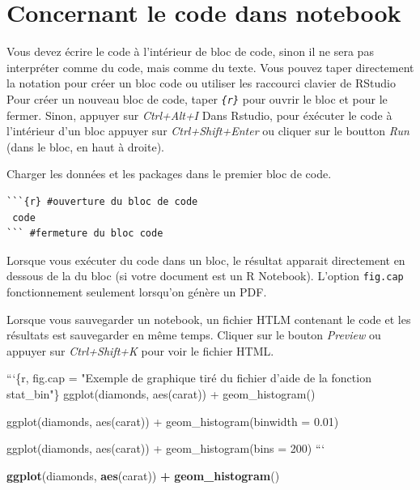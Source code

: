 \documentclass[12pt,]{book}
\newenvironment{Shaded}{\begin{snugshade}}{\end{snugshade}}
\newcommand{\BaseNTok}[1]{\textcolor[rgb]{0.06,0.06,0.06}{#1}}
\newcommand{\KeywordTok}[1]{\textcolor[rgb]{0.27,0.27,0.27}{\textbf{#1}}}
\newcommand{\NormalTok}[1]{#1}
\newcommand{\OperatorTok}[1]{\textcolor[rgb]{0.43,0.43,0.43}{\textbf{#1}}}
\newcommand{\StringTok}[1]{\textcolor[rgb]{0.5,0.5,0.5}{#1}}
\begin{document}
\hypertarget{concernant-le-code-dans-notebook}{%
\section{Concernant le code dans notebook}\label{concernant-le-code-dans-notebook}}

Vous devez écrire le code à l'intérieur de bloc de code, sinon il ne sera pas interpréter comme du code, mais comme du texte.
Vous pouvez taper directement la notation pour créer un bloc code ou utiliser les raccourci clavier de RStudio
Pour créer un nouveau bloc de code, taper \emph{\texttt{\textasciigrave{}\textasciigrave{}\textasciigrave{}\{r\}}} pour ouvrir le bloc et \emph{\texttt{\textasciigrave{}\textasciigrave{}\textasciigrave{}}} pour le fermer.
Sinon, appuyer sur \emph{Ctrl+Alt+I}
Dans Rstudio, pour éxécuter le code à l'intérieur d'un bloc appuyer sur \emph{Ctrl+Shift+Enter} ou cliquer sur le boutton \emph{Run} (dans le bloc, en haut à droite).

Charger les données et les packages dans le premier bloc de code.

\begin{verbatim}
```{r} #ouverture du bloc de code
 code
``` #fermeture du bloc code
\end{verbatim}

Lorsque vous exécuter du code dans un bloc, le résultat apparait directement en dessous de la du bloc (si votre document est un R Notebook).
L'option \texttt{fig.cap} fonctionnement seulement lorsqu'on génère un PDF.

Lorsque vous sauvegarder un notebook, un fichier HTLM contenant le code et les résultats est sauvegarder en même temps. Cliquer sur le bouton \emph{Preview} ou appuyer sur \emph{Ctrl+Shift+K} pour voir le fichier HTML.

\begin{Shaded}
\begin{Highlighting}[]
\BaseNTok{```\{r, fig.cap = "Exemple de graphique tiré du fichier d'aide de la fonction stat_bin"\}}
\BaseNTok{ggplot(diamonds, aes(carat)) +}
\BaseNTok{  geom_histogram()}

\BaseNTok{ggplot(diamonds, aes(carat)) +}
\BaseNTok{  geom_histogram(binwidth = 0.01)}

\BaseNTok{ggplot(diamonds, aes(carat)) +}
\BaseNTok{  geom_histogram(bins = 200)}
\BaseNTok{```}
\end{Highlighting}
\end{Shaded}

\begin{Shaded}
\begin{Highlighting}[]
\KeywordTok{ggplot}\NormalTok{(diamonds, }\KeywordTok{aes}\NormalTok{(carat)) }\OperatorTok{+}
\StringTok{  }\KeywordTok{geom_histogram}\NormalTok{()}
\end{Highlighting}
\end{Shaded}
\end{document}
